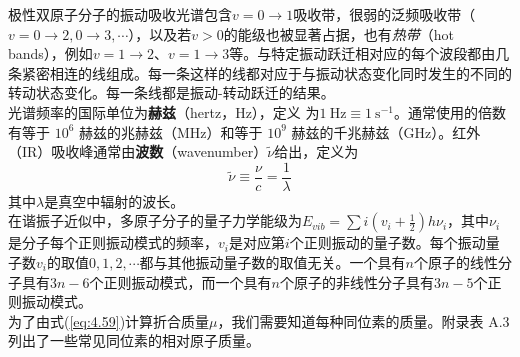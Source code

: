     \indent 极性双原子分子的振动吸收光谱包含$v= 0 \to 1$吸收带，很弱的泛频吸收带（$v = 0\to 2, 0 \to 3, \cdots$），以及若$v>0$的能级也被显著占据，也有\textit{热带}（hot bands），例如$v = 1 \to 2$、$v = 1 \to 3$等。与特定振动跃迁相对应的每个波段都由几条紧密相连的线组成。每一条这样的线都对应于与振动状态变化同时发生的不同的转动状态变化。每一条线都是振动-转动跃迁的结果。\\
    \indent 光谱频率的国际单位为\textbf{赫兹}（hertz，Hz），定义
    为$1 \:\mathrm{Hz} \equiv 1 \:\mathrm{s}^{-1}$。通常使用的倍数有等于 $10^6$ 赫兹的兆赫兹（MHz）和等于 $10^9$ 赫兹的千兆赫兹（GHz）。红外（IR）吸收峰通常由\textbf{波数}（wavenumber）$\tilde{\nu}$给出，定义为
    \begin{equation}
        \boxed{
            \tilde{\nu} \equiv \frac{\nu}{c} = \frac{1}{\lambda}
        }
        \label{eq:4.64}
    \end{equation}
    其中$\lambda$是真空中辐射的波长。\\
    \indent 在谐振子近似中，多原子分子的量子力学能级为$E_{vib} = \sum i\left(v_i+\frac{1}{2}\right)h\nu_i$，其中$\nu_i$是分子每个正则振动模式的频率，$v_i$是对应第$i$个正则振动的量子数。每个振动量子数$v_i$的取值$0,1,2,\cdots$都与其他振动量子数的取值无关。一个具有$n$个原子的线性分子具有$3n-6$个正则振动模式，而一个具有$n$个原子的非线性分子具有$3n-5$个正则振动模式。\\
    \indent 为了由式(\ref{eq:4.59})计算折合质量$\mu$，我们需要知道每种同位素的质量。附录表 A.3 列出了一些常见同位素的相对原子质量。\\
